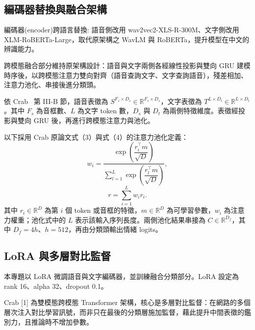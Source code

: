 \subsection{編碼器替換與融合架構}
編碼器(encoder)跨語言替換: 語音側改用 wav2vec2-XLS-R-300M、文字側改用 XLM-RoBERTa-Large，取代原架構之 WavLM 與 RoBERTa，提升模型在中文的辨識能力。

跨模態融合部分維持原架構設計：語音與文字兩側各經線性投影與雙向 GRU 建模時序後，以跨模態注意力雙向對齊（語音查詢文字、文字查詢語音），殘差相加、注意力池化、串接後進分類頭。

依 Crab~\cite{crab} 第 III-B 節，語音表徵為 $S^{F_s\times D_s}\in\mathbb R^{F_s\times D_s}$，文字表徵為 $T^{L\times D_t}\in\mathbb R^{L\times D_t}$。其中 $F_s$ 為音框數、$L$ 為文字 token 數，$D_s$ 與 $D_t$ 為兩側特徵維度。表徵經投影與雙向 GRU 後，再進行跨模態注意力與池化。

以下採用 Crab 原論文式（3）與式（4）的注意力池化定義：
\begin{equation}
 w_i=
 \frac{\exp\!\left(\dfrac{r_i^\top m}{\sqrt D}\right)}
 {\sum_{l=1}^{L}\exp\!\left(\dfrac{r_l^\top m}{\sqrt D}\right)},
 \label{eq:paper_pool_weights}
\end{equation}
\begin{equation}
 r=\sum_{i=1}^{L}w_i r_i.
 \label{eq:paper_pool}
\end{equation}
其中 $r_i\in\mathbb R^D$ 為第 $i$ 個 token 或音框的特徵，$m\in\mathbb R^D$ 為可學習參數，$w_i$ 為注意力權重；池化式中的 $L$ 表示該輸入序列長度。兩側池化結果串接為 $C\in\mathbb R^{D_f}$，其中 $D_f=4h$、$h=512$，再由分類頭輸出情緒 logits。


\subsection{LoRA 與多層對比監督}
本專題以 LoRA 微調語音與文字編碼器，並訓練融合分類部分。LoRA 設定為 rank 16、alpha 32、dropout 0.1。

Crab [1] 為雙模態跨模態 Transformer 架構，核心是多層對比監督：在網路的多個層次注入對比學習訊號，而非只在最後的分類層施加監督，藉此提升中間表徵的鑑別力，且推論時不增加參數。

